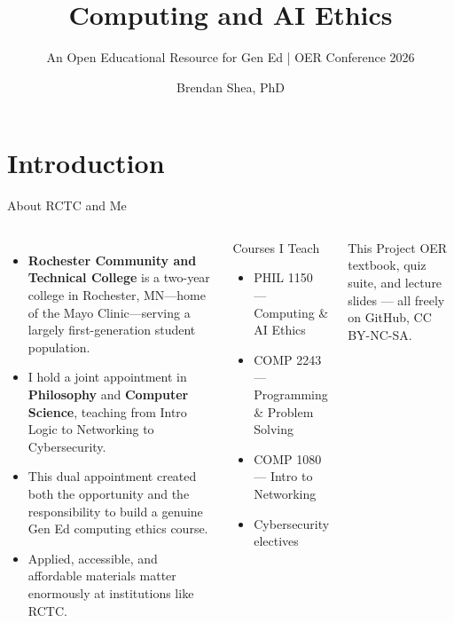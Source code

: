 \documentclass[aspectratio=169,10pt]{beamer}
\title{Computing and AI Ethics}
\subtitle{An Open Educational Resource for Gen Ed | OER Conference 2026}
\author{Brendan Shea, PhD}
\institute{Rochester Community and Technical College --- Philosophy \& Computer Science}
\date{}
\begin{document}
{%
%
\begin{frame}
\titlepage
\end{frame}%
}

\section{Introduction}

\begin{frame}{About RCTC and Me}
\begin{columns}[c]
\begin{itemize}
  \item \textbf{Rochester Community and Technical College} is a two-year college in Rochester, MN---home of the Mayo Clinic---serving a largely first-generation student population.
  \item I hold a joint appointment in \textbf{Philosophy} and \textbf{Computer Science}, teaching from Intro Logic to Networking to Cybersecurity.
  \item This dual appointment created both the opportunity and the responsibility to build a genuine Gen Ed computing ethics course.
  \item Applied, accessible, and affordable materials matter enormously at institutions like RCTC.
\end{itemize}
\begin{block}{Courses I Teach}
\footnotesize
\begin{itemize}
  \item PHIL 1150 --- Computing \& AI Ethics
  \item COMP 2243 --- Programming \& Problem Solving
  \item COMP 1080 --- Intro to Networking
  \item Cybersecurity electives
\end{itemize}
\end{block}
\vspace{0.3em}
\begin{block}{This Project}
\footnotesize OER textbook, quiz suite, and lecture slides --- all freely on GitHub, CC BY-NC-SA.
\end{block}
\end{columns}
\end{frame}
\end{document}
